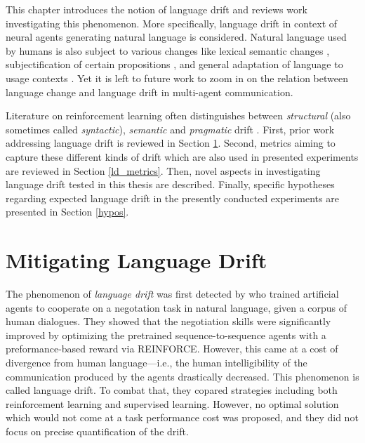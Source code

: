 This chapter introduces the notion of language drift and reviews work investigating this phenomenon. More specifically, language drift in context of neural agents generating natural language is considered. Natural language used by humans is also subject to various changes like lexical semantic changes \parencite{blank1999new}, subjectification of certain propositions \parencite{traugott1989rise},  and general adaptation of language to usage contexts \parencite{five2009language}. Yet it is left to future work to zoom in on the relation between language change and language drift in multi-agent communication. 

Literature on reinforcement learning often distinguishes between \textit{structural} (also sometimes called \textit{syntactic}), \textit{semantic} and \textit{pragmatic} drift \parencite{lazaridou2020multi}.
First, prior work addressing language drift is reviewed in Section \ref{ld_mitigation}. Second, metrics aiming to capture these different kinds of drift which are also used in presented experiments are reviewed in Section \ref{ld_metrics}. Then, novel aspects in investigating language drift tested in this thesis are described. Finally, specific hypotheses regarding expected language drift in the presently conducted experiments are presented in Section \ref{hypos}. 

\section{Mitigating Language Drift}
\label{ld_mitigation}
The phenomenon of \textit{language drift} was first detected by \cite{lewis2017deal} who trained artificial agents to cooperate on a negotation task in natural language, given a corpus of human dialogues. They showed that the negotiation skills were significantly improved by optimizing the pretrained sequence-to-sequence agents with a preformance-based reward via REINFORCE. However, this came at a cost of divergence from human language---i.e., the human intelligibility of the communication produced by the agents drastically decreased. This phenomenon is called language drift. To combat that, they copared strategies including both reinforcement learning and supervised learning. However, no optimal solution which would not come at a task performance cost was proposed, and they did not focus on precise quantification of the drift. 

